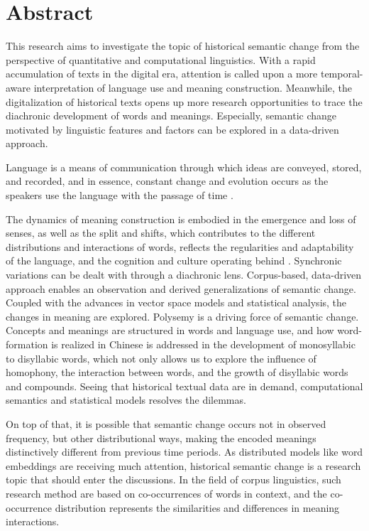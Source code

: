 

\chapter*{Abstract}
This research aims to investigate the topic of historical semantic change from the perspective of quantitative and computational linguistics. With a rapid accumulation of texts in the digital era, attention is called upon a more temporal-aware interpretation of language use and meaning construction. Meanwhile, the digitalization of historical texts opens up more research opportunities to trace the diachronic development of words and meanings. Especially, semantic change motivated by linguistic features and factors can be explored in a data-driven approach. 

Language is a means of communication through which ideas are conveyed, stored, and recorded, and in essence, constant change and evolution occurs as the speakers use the language with the passage of time \parencite[61]{blank1999new}. 


The dynamics of meaning construction is embodied in the emergence and loss of senses, as well as the split and shifts, which contributes to the different distributions and interactions of words, reflects the regularities and adaptability of the language, and the cognition and culture operating behind \parencite[63]{blank1999new}. Synchronic variations can be dealt with through a diachronic lens. Corpus-based, data-driven approach enables an observation and derived generalizations of semantic change. Coupled with the advances in vector space models and statistical analysis, the changes in meaning are explored. Polysemy is a driving force of semantic change. Concepts and meanings are structured in words and language use, and how word-formation is realized in Chinese is addressed in the development of monosyllabic to disyllabic words, which not only allows us to explore the influence of homophony, the interaction between words, and the growth of disyllabic words and compounds. Seeing that historical textual data are in demand, computational semantics and statistical models resolves the dilemmas. 

On top of that, it is possible that semantic change occurs not in observed frequency, but other distributional ways, making the encoded meanings distinctively different from previous time periods. As distributed models like word embeddings are receiving much attention, historical semantic change is a research topic that should enter the discussions. In the field of corpus linguistics, such research method are based on co-occurrences of words in context, and the co-occurrence distribution represents the similarities and differences in meaning interactions. 

